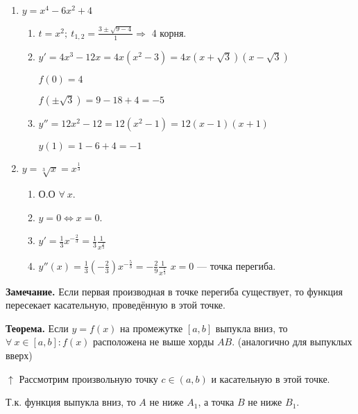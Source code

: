 \documentclass{article}
\begin{document}
\begin{enumerate}
    \item \( y = x^4 - 6x^2 + 4 \)

    \begin{enumerate}
        \item \( t = x^2;\ t_{1, 2} = \frac{3 \pm \sqrt{9 - 4}}{1} \Rightarrow \) 4 корня.
        \item \(y' = 4x^3-12x = 4x(x^2 - 3) = 4x(x + \sqrt{3})(x - \sqrt{3})\)

        \( f(0) = 4 \)

        \( f(\pm \sqrt{3}) = 9 - 18 + 4 = -5 \)

        \item \( y'' = 12x^2 - 12 = 12(x^2 - 1) = 12(x - 1)(x + 1) \)

        \( y(1) = 1 - 6 + 4 = -1 \)
    \end{enumerate}
    \item \( y = \sqrt[3]{x} = x^{\frac{1}{3}} \)
    
    \begin{enumerate}
        \item О.О \( \forall\ x \).
        \item \(y = 0 \Leftrightarrow x = 0\).
        \item \( y' = \frac{1}{3}x^{-\frac{2}{3}} = \frac{1}{3}\frac{1}{x^{\frac{2}{3}}} \)
        \item \( y''(x) = \frac{1}{3}(-\frac{2}{3})x^{-\frac{5}{3}} = -\frac{2}{9}\frac{1}{x^{\frac{5}{3}}} \)
        \( x = 0 \) --- точка перегиба.
    \end{enumerate}
\end{enumerate}

\textbf{Замечание.} Если первая производная в точке перегиба существует, то функция пересекает касательную, проведённую в этой точке.


\textbf{Теорема.} Если \( y = f(x) \) на промежутке \( [a, b] \) выпукла вниз, то \( \forall\ x \in [a, b]: f(x) \) расположена не выше хорды \(AB\). (аналогично для выпуклых вверх)

\(\uparrow\) Рассмотрим произвольную точку \(c \in (a,b)\) и касательную в этой точке.

Т.к. функция выпукла вниз, то \(A\) не ниже \(A_1\), а точка \(B\) не ниже \(B_1\).
\end{document}
